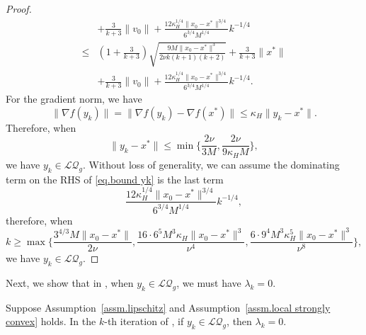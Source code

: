 \documentclass{mcom-l}
\numberwithin{equation}{section}
\begin{document}
\begin{proof}
\begin{equation}
\begin{aligned}
                            & +\frac{3}{k+3}\|v_0\|+\frac{12\kappa_H^{1/4}\|x_0-x^*\|^{3/4}}{6^{3/4}M^{1/4}}k^{-1/4} \\
            \leq            & (1+\frac{3}{k+3})\sqrt{\frac{9M\|x_0-x^*\|^3}{2\nu k(k+1)(k+2)}}+\frac{3}{k+3}\|x^*\|  \\&
            +\frac{3}{k+3}\|v_0\|+\frac{12\kappa_H^{1/4}\|x_0-x^*\|^{3/4}}{6^{3/4}M^{1/4}}k^{-1/4}.
        \end{aligned}
    \end{equation}
    For the gradient norm, we have
    \begin{equation*}
        \|\nabla f(y_k)\| = \|\nabla f(y_k)-\nabla f(x^*)\|\leq \kappa_H\|y_k-x^*\|.
    \end{equation*}
    Therefore, when
    \begin{equation}\label{eq.quadratic region guarantee}
        \|y_k-x^*\|\leq \min\{\frac{2\nu}{3M},\frac{2\nu}{9\kappa_HM}\},
    \end{equation}
    we have $y_k\in\mathcal{LQ}_g$. Without loss of generality, we can assume the dominating term on the RHS of \eqref{eq.bound yk} is the last term
    \begin{equation*}
        \frac{12\kappa_H^{1/4}\|x_0-x^*\|^{3/4}}{6^{3/4}M^{1/4}}k^{-1/4},
    \end{equation*}
    therefore, when
    \begin{equation*}
        k\geq \max\{\frac{3^{4/3}M\|x_0-x^*\|}{2\nu}, \frac{16\cdot6^5 M^3\kappa_H\|x_0-x^*\|^3}{\nu^4},\frac{6\cdot9^4 M^3\kappa_H^5\|x_0-x^*\|^3}{\nu^8}\},
    \end{equation*}
    we have $y_k\in\mathcal{LQ}_g$.
\end{proof}
Next, we show that in , when $y_k\in\mathcal{LQ}_g$, we must have $\lambda_k=0$.
\begin{lemma}
    \label{lem.detection of local quadratic}
    Suppose Assumption~\ref{assm.lipschitz} and Assumption~\ref{assm.local strongly convex} holds. In the $k$-th iteration of , if $y_k\in\mathcal{LQ}_g$, then $\lambda_k=0$.
\end{lemma}
\end{document}
